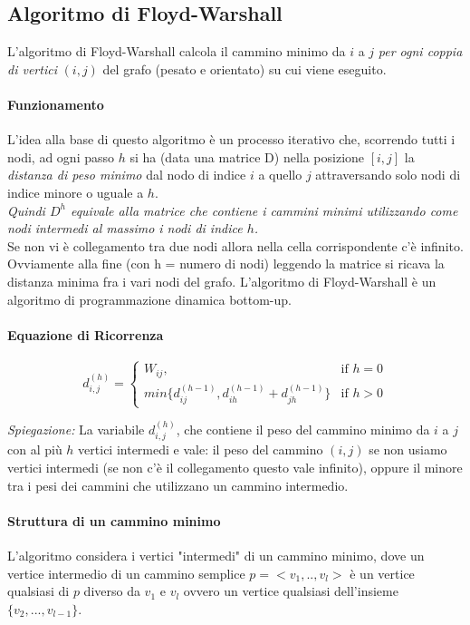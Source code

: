 \documentclass[12pt, a4paper, openany]{book}
\newcommand{\spiegazione}[1]{\begin{box_spiegazione} \small{ \emph{Spiegazione: }#1}\end{box_spiegazione}}
\begin{document}
\subsection{Algoritmo di Floyd-Warshall}
L'algoritmo di Floyd-Warshall calcola il cammino minimo da $i$ a $j$ \emph{per ogni coppia di vertici} $(i,j)$ del grafo (pesato e orientato) su cui viene eseguito.

\paragraph{Funzionamento}
L'idea alla base di questo algoritmo è un processo iterativo che, scorrendo tutti i nodi, ad ogni passo $h$ si ha
(data una matrice D) nella posizione $[i,j]$ la \emph{distanza di peso minimo} dal nodo di indice $i$ a quello $j$ attraversando solo nodi di indice minore o uguale a $h$.\\
\textit{Quindi $D^h$ equivale alla matrice che contiene i cammini minimi utilizzando come nodi intermedi al massimo i nodi di indice $h$.}
\\Se non vi è collegamento tra due nodi allora nella cella corrispondente c'è infinito.
Ovviamente alla fine (con h = numero di nodi) leggendo la matrice si ricava la distanza minima fra i vari nodi del grafo.
L'algoritmo di Floyd-Warshall è un algoritmo di programmazione dinamica bottom-up.

\paragraph{Equazione di Ricorrenza}

\begin{equation*}
	d^{(h)}_{i,j}= \begin{cases}
		W_{ij},                                                & \text{if $h = 0$} \\
		min\{ d^{(h-1)}_{ij},d^{(h-1)}_{ih} + d^{(h-1)}_{jh}\} & \text{if $h > 0$}
	\end{cases}
\end{equation*}
\spiegazione{
La variabile $d^{(h)}_{i,j}$, che contiene il peso del cammino minimo da $i$ a $j$ con al più $h$ vertici intermedi e vale:
il peso del cammino $(i,j)$ se non usiamo vertici intermedi (se non c'è il collegamento questo vale infinito), oppure il minore tra i pesi dei cammini che utilizzano un cammino intermedio.
}
\paragraph*{Struttura di un cammino minimo}
L'algoritmo considera i vertici "intermedi" di un cammino minimo, dove un vertice intermedio di un cammino semplice $p=<v_1,..,v_l>$ 
è un vertice qualsiasi di $p$ diverso da $v_1$ e $v_l$ ovvero un vertice qualsiasi dell'insieme $\{v_2,...,v_{l-1}\}$.
\end{document}
